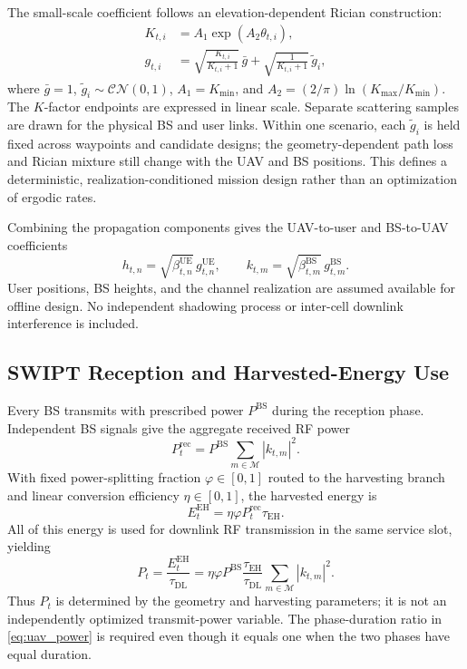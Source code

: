 \documentclass[conference]{IEEEtran}
\newcommand{\UE}{\mathrm{UE}}
\newcommand{\BS}{\mathrm{BS}}
\newcommand{\EH}{\mathrm{EH}}
\newcommand{\DL}{\mathrm{DL}}
\newcommand{\setM}{\mathcal{M}}
\begin{document}
The small-scale coefficient follows an elevation-dependent Rician construction:
\begin{align}
K_{t,i}&=A_1\exp(A_2\theta_{t,i}),\label{eq:rician_k}\\
g_{t,i}&=\sqrt{\frac{K_{t,i}}{K_{t,i}+1}}\,\bar g
+\sqrt{\frac{1}{K_{t,i}+1}}\,\widetilde g_i,
\label{eq:rician_fading}
\end{align}
where $\bar g=1$, $\widetilde g_i\sim\mathcal{CN}(0,1)$, $A_1=K_{\min}$, and $A_2=(2/\pi)\ln(K_{\max}/K_{\min})$. The $K$-factor endpoints are expressed in linear scale. Separate scattering samples are drawn for the physical BS and user links. Within one scenario, each $\widetilde g_i$ is held fixed across waypoints and candidate designs; the geometry-dependent path loss and Rician mixture still change with the UAV and BS positions. This defines a deterministic, realization-conditioned mission design rather than an optimization of ergodic rates.

Combining the propagation components gives the UAV-to-user and BS-to-UAV coefficients
\begin{equation}
h_{t,n}=\sqrt{\beta_{t,n}^{\UE}}\,g_{t,n}^{\UE},\qquad
k_{t,m}=\sqrt{\beta_{t,m}^{\BS}}\,g_{t,m}^{\BS}.
\label{eq:channels}
\end{equation}
User positions, BS heights, and the channel realization are assumed available for offline design. No independent shadowing process or inter-cell downlink interference is included.

\subsection{SWIPT Reception and Harvested-Energy Use}
Every BS transmits with prescribed power $P^{\BS}$ during the reception phase. Independent BS signals give the aggregate received RF power
\begin{equation}
P_{t}^{\mathrm{rec}}=P^{\BS}\sum_{m\in\setM}|k_{t,m}|^2.
\label{eq:received_power}
\end{equation}
With fixed power-splitting fraction $\varphi\in[0,1]$ routed to the harvesting branch and linear conversion efficiency $\eta\in[0,1]$, the harvested energy is
\begin{equation}
E_t^{\EH}=\eta\varphi P_t^{\mathrm{rec}}\tau_{\EH}.
\label{eq:harvested_energy}
\end{equation}
All of this energy is used for downlink RF transmission in the same service slot, yielding
\begin{equation}
P_t=\frac{E_t^{\EH}}{\tau_{\DL}}
=\eta\varphi P^{\BS}\frac{\tau_{\EH}}{\tau_{\DL}}
\sum_{m\in\setM}|k_{t,m}|^2.
\label{eq:uav_power}
\end{equation}
Thus $P_t$ is determined by the geometry and harvesting parameters; it is not an independently optimized transmit-power variable. The phase-duration ratio in \cref{eq:uav_power} is required even though it equals one when the two phases have equal duration.
\end{document}
